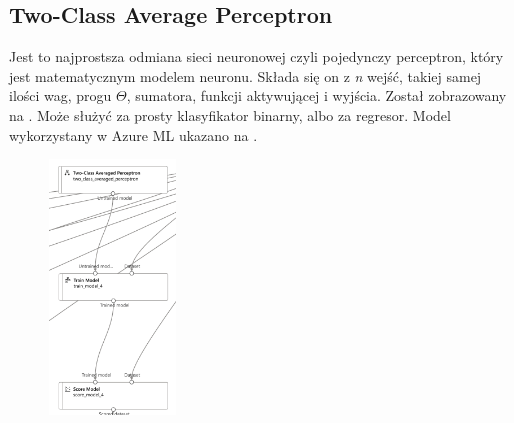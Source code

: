 \subsection{Two-Class Average Perceptron}
Jest to najprostsza odmiana sieci neuronowej czyli pojedynczy perceptron, który jest matematycznym modelem neuronu. Składa się on z \textit{n} wejść, takiej samej ilości wag, progu $\Theta$, sumatora, funkcji aktywującej i wyjścia. Został zobrazowany na . Może służyć za prosty klasyfikator binarny, albo za regresor. Model wykorzystany w Azure ML ukazano na .
\begin{figure}[H]
    \centering
    \includegraphics[width=0.3\textwidth]{images/ap_pipe}
    \label{fig:ap-pipe}
\end{figure}

